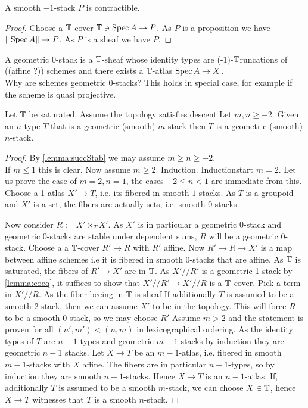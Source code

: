 \documentclass{article}
\newcommand{\affineA}{(affine ?)}
\newcommand{\truncation}{$\bT$runcation}
\newcommand{\red}[1]{{\color{red} #1}}
\begin{document}
\begin{lemma}
    A smooth $-1$-stack $P$ is contractible.
\end{lemma}
\begin{proof}
    Choose a $\mathbb{T}$-cover $\mathbb{T} \ni \operatorname{Spec} A \to P$. As $P$ is a proposition we have $\| \operatorname{Spec} A\| \to P$. As $P$ is a sheaf we have $P$.
\end{proof}
\begin{example}
    A geometric 0-stack is a $\mathbb{T}$-sheaf whose identity types are \red{(-1)-\truncation s of} (\affineA) schemes and there exists a $\mathbb{T}$-atlas $\operatorname{Spec} A \to X$. \\
    Why are schemes geometric 0-stacks? This holds in special case, for example if the scheme is quasi projective. 
\end{example}
\begin{theorem}
    Let $\mathbb{T}$ be saturated. Assume the topology satisfies descent Let $m , n \ge -2$. Given an $n$-type $T$ that is a geometric (smooth) $m$-stack then $T$ is a geometric (smooth) $n$-stack.
\end{theorem}


\begin{proof}
    
    By \ref{lemma:succStab} we may assume $m \ge n \ge -2$. \\
    If $m \le 1$ this is clear. Now assume $m \ge 2$. 
    Induction. 
    Inductionstart $m = 2$. Let us prove the case of $m = 2,n=1$, the cases $-2 \le n<1$ are immediate from this. \\
    Choose a 1-atlas $X' \to T$, i.e. its fibered in smooth $1$-stacks. As $T$ is a groupoid and $X'$ is a set, the fibers are actually sets, i.e. smooth 0-stacks. 
    
    Now consider $R := X' \times_T X'$. As $X'$ is in particular a geometric 0-stack and geometric 0-stacks are stable under dependent sums, $R$ will be a geometric 0-stack. Choose a  a $\mathbb{T}$-cover $R' \to R$ with $R'$ affine. Now $R' \to R \to X'$ is a map between affine schemes i.e it is fibered in smooth 0-stacks that are affine. As $\mathbb{T}$ is saturated, the fibers of $R' \to X'$ are in $\mathbb{T}$. As $X' // R'$ is a geometric 1-stack by \ref{lemma:coeq}, it suffices to show that $X' // R' \to X' // R$ is a $\mathbb{T}$-cover. Pick a term in $X' // R$. As the fiber beeing in $\mathbb{T}$ is sheaf 
    If additionally $T$ is assumed to be a smooth $2$-stack, then we can assume $X'$ to be in the topology. This will force $R$ to be a smooth $0$-stack, so we may choose $R'$
    Assume $m > 2$ and the statement is proven for all $(n',m') < (n,m)$ in lexicographical ordering. As the identity types of $T$ are $n-1$-types and geometric $m-1$ stacks by induction they are geometric $n-1$ stacks. Let $X \to T$ be an $m-1$-atlas, i.e. fibered in smooth $m-1$-stacks with $X$ affine. The fibers are in particular $n-1$-types, so by induction they are smooth $n-1$-stacks. Hence $X \to T$ is an $n-1$-atlas. If, additionally $T$ is assumed to be a smooth $m$-stack, we can choose $X \in \mathbb{T}$, hence $X \to T$ witnesses that $T$ is a smooth $n$-stack.
    
\end{proof}
\end{document}
